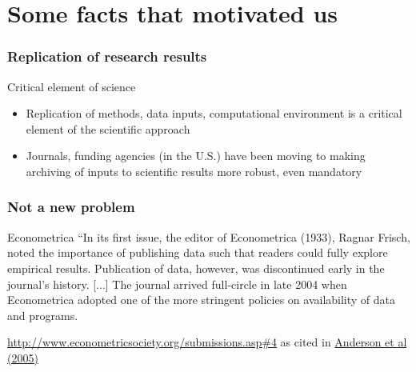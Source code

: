 %
%
%
\section[Motivation]{Some facts that motivated us}


\frame{\tableofcontents[currentsection]}


\begin{frame}
\frametitle{Replication of research results}
\begin{block}{Critical element of science}
\begin{itemize}
\item Replication of methods, data inputs, computational environment is a critical element of the scientific approach
\item Journals, funding agencies (in the U.S.) have been moving to making archiving of inputs to scientific results more robust, even mandatory
\end{itemize}
\end{block}
\end{frame}

\begin{frame}
\frametitle{Not a new problem}
\begin{block}{Econometrica}
``In its first issue, the editor of Econometrica (1933), Ragnar Frisch, noted
the importance of publishing data such that readers could fully explore
empirical results.  Publication of data, however, was discontinued early in
the journal's history.  [...]  The journal arrived full-circle in late 2004 when Econometrica
adopted one of the more stringent policies on availability of data and
programs.
\end{block}
\tiny \href{http://www.econometricsociety.org/submissions.asp\#4}{http://www.econometricsociety.org/submissions.asp\#4} as cited in \href{http://research.stlouisfed.org/wp/2005/2005-014.pdf}{Anderson et al (2005)}
\end{frame}


